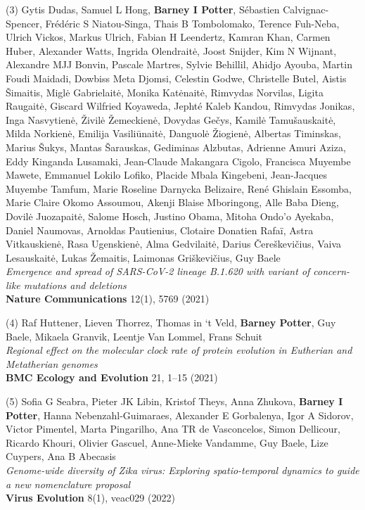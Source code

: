 (3) Gytis Dudas, Samuel L Hong, \textbf{Barney I Potter}, Sébastien Calvignac-Spencer, Frédéric S Niatou-Singa, Thais B Tombolomako, Terence Fuh-Neba, Ulrich Vickos, Markus Ulrich, Fabian H Leendertz, Kamran Khan, Carmen Huber, Alexander Watts, Ingrida Olendraitė, Joost Snijder, Kim N Wijnant, Alexandre MJJ Bonvin, Pascale Martres, Sylvie Behillil, Ahidjo Ayouba, Martin Foudi Maidadi, Dowbiss Meta Djomsi, Celestin Godwe, Christelle Butel, Aistis Šimaitis, Miglė Gabrielaitė, Monika Katėnaitė, Rimvydas Norvilas, Ligita Raugaitė, Giscard Wilfried Koyaweda, Jephté Kaleb Kandou, Rimvydas Jonikas, Inga Nasvytienė, Živilė Žemeckienė, Dovydas Gečys, Kamilė Tamušauskaitė, Milda Norkienė, Emilija Vasiliūnaitė, Danguolė Žiogienė, Albertas Timinskas, Marius Šukys, Mantas Šarauskas, Gediminas Alzbutas, Adrienne Amuri Aziza, Eddy Kinganda Lusamaki, Jean-Claude Makangara Cigolo, Francisca Muyembe Mawete, Emmanuel Lokilo Lofiko, Placide Mbala Kingebeni, Jean-Jacques Muyembe Tamfum, Marie Roseline Darnycka Belizaire, René Ghislain Essomba, Marie Claire Okomo Assoumou, Akenji Blaise Mboringong, Alle Baba Dieng, Dovilė Juozapaitė, Salome Hosch, Justino Obama, Mitoha Ondo’o Ayekaba, Daniel Naumovas, Arnoldas Pautienius, Clotaire Donatien Rafaï, Astra Vitkauskienė, Rasa Ugenskienė, Alma Gedvilaitė, Darius Čereškevičius, Vaiva Lesauskaitė, Lukas Žemaitis, Laimonas Griškevičius, Guy Baele\\
\textit{Emergence and spread of SARS-CoV-2 lineage B.1.620 with variant of concern-like mutations and deletions}\\
\textbf{Nature Communications} 12(1), 5769 (2021)

(4) Raf Huttener, Lieven Thorrez, Thomas in ‘t Veld, \textbf{Barney Potter}, Guy Baele, Mikaela Granvik, Leentje Van Lommel, Frans Schuit\\
\textit{Regional effect on the molecular clock rate of protein evolution in Eutherian and Metatherian genomes}\\
\textbf{BMC Ecology and Evolution} 21, 1–15 (2021)

(5) Sofia G Seabra, Pieter JK Libin, Kristof Theys, Anna Zhukova, \textbf{Barney I Potter}, Hanna Nebenzahl-Guimaraes, Alexander E Gorbalenya, Igor A Sidorov, Victor Pimentel, Marta Pingarilho, Ana TR de Vasconcelos, Simon Dellicour, Ricardo Khouri, Olivier Gascuel, Anne-Mieke Vandamme, Guy Baele, Lize Cuypers, Ana B Abecasis\\
\textit{Genome-wide diversity of Zika virus: Exploring spatio-temporal dynamics to guide a new nomenclature proposal}\\
\textbf{Virus Evolution} 8(1), veac029 (2022)

